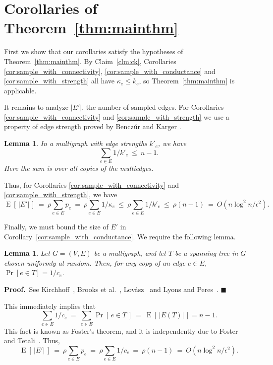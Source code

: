 \documentclass[11pt]{article}
\newcommand{\proofbelow}{8pt}
\numberwithin{equation}{section}
\newtheorem{lemma}[theorem]{Lemma}
\renewenvironment{proof}{\noindent\textbf{Proof.}\,}{\afterproof}
\newcommand{\afterproof}{\hfill $\blacksquare$ \par \vspace{\proofbelow}}
\newcommand{\eps}{\epsilon}
\newcommand{\abs}[1]{\lvert #1 \rvert}
\newcommand{\card}[1]{\abs{#1}}
\newcommand{\prob}[1]{\operatorname{Pr}\left[\,#1\,\right]}               \newcommand{\probg}[2]{\operatorname{Pr}\left[\,#1 \:\mid\: #2\,\right]}
\newcommand{\expect}[1]{\operatorname{E}\left[\,#1\,\right]}              \newcommand{\expectg}[2]{\operatorname{E}\left[\,#1 \,\mid\, #2\,\right]}
\newcommand{\AppendixName}[1]{\label{app:#1}}
\newcommand{\Claim}[1]{Claim~\ref{clm:#1}}
\newcommand{\Corollary}[1]{Corollary~\ref{cor:#1}}
\newcommand{\LemmaName}[1]{\label{lem:#1}}
\newcommand{\Theorem}[1]{Theorem~\ref{thm:#1}}
\begin{document}
\section{Corollaries of \Theorem{mainthm}}
\AppendixName{corollaries}

First we show that our corollaries satisfy the hypotheses of \Theorem{mainthm}.
By \Claim{ck}, Corollaries \ref{cor:sample_with_connectivity}, \ref{cor:sample_with_conductance}
and \ref{cor:sample_with_strength} all have $\kappa_e \leq k_e$,
so \Theorem{mainthm} is applicable.

It remains to analyze $|E'|$, the number of sampled edges.
For Corollaries \ref{cor:sample_with_connectivity} and \ref{cor:sample_with_strength}
we use a property of edge strength proved by Bencz\'ur and Karger \cite[Lemma 2.7]{BK}. 

\begin{lemma}
\LemmaName{sample_size}
In a multigraph with edge strengths $k'_e$, we have
$$
\sum_{e\in E} 1/k'_e ~\le~ n-1.
$$
Here the sum is over all copies of the multiedges.
\end{lemma}

Thus, for Corollaries \ref{cor:sample_with_connectivity} and \ref{cor:sample_with_strength}, we have
$$
\expect{\card{E'}}
    ~=~ \rho \sum_{e\in E} p_e
    ~=~ \rho \sum_{e\in E} 1/\kappa_e
    ~\le~ \rho \sum_{e\in E} 1/k'_e
    ~\le~ \rho (n-1)
    ~=~ O(n \log^2 n/\eps^2).
$$

Finally, we must bound the size of $E'$ in \Corollary{sample_with_conductance}.
We require the following lemma.

\begin{lemma}
\LemmaName{kirchoff}
Let $G=(V,E)$ be a multigraph, and let $T$ be a spanning tree in $G$
chosen uniformly at random.
Then, for any copy of an edge $e \in E$, $\Pr[e \in T] = 1/c_e$.
\end{lemma}
\begin{proof}
See Kirchhoff~\cite{Kirchhoff},
Brooks et al.~\cite[pp.~318]{BSST},
Lov\'asz~\cite[Theorem 4.1(i) and Corollary 4.2]{LovaszSurvey} and
Lyons and Peres~\cite[Corollary 4.4]{LyonsPeres}.
\end{proof}

This immediately implies that
$$
    \sum_{e\in E} 1/c_e ~=~ \sum_{e\in E} \prob{ e \in T } ~=~ \expect{ \card{E(T)} } = n-1.
$$
This fact is known as Foster's theorem,
and it is independently due to Foster~\cite{Foster} and Tetali~\cite{Tetali}.
Thus,
$$
    \expect{ \card{E'} } ~=~ \rho \sum_{e\in E} p_e ~=~ \rho \sum_{e\in E} 1/c_e ~=~ \rho (n-1)
        ~=~ O( n \log^2 n / \eps^2).
$$
\end{document}

